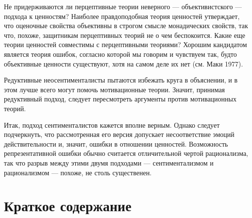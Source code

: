 \documentclass[11pt]{book}
\begin{document}
Не придерживаются ли перцептивные теории неверного --- объективистского --- подхода к ценностям? Наиболее правдоподобная теория ценностей утверждает, что оценочные свойства объективны в строгом смысле монадических свойств, так что, похоже, защитникам перцептивных теорий не о чем беспокоится. Какие еще теории ценностей совместимы с перцептивными теориями? Хорошим кандидатом является теория ошибок, согласно которой мы говорим и чувствуем так, будто объективные ценности существуют, хотя на самом деле их нет (см. Маки 1977).

Редуктивные неосентименталисты пытаются избежать круга в объяснении, и в этом лучше всего могут помочь мотивационные теории. Значит, принимая редуктивный подход, следует пересмотреть аргументы против мотивационных теорий.

Итак, подход сентименталистов кажется вполне верным. Однако следует подчеркнуть, что рассмотренная его версия допускает несоответствие эмоций действительности и, значит, ошибки в отношении ценностей. Возможность репрезентативной ошибки обычно считается отличительной чертой рационализма, так что разрыв между этими двумя подходами --- сентиментализмом и рационализмом --- похоже, не столь существенен.

\section{Краткое содержание}
\end{document}
